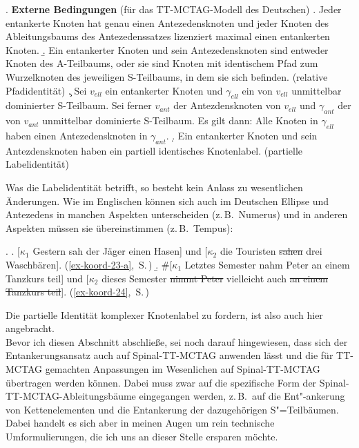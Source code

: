 \ex. {\bf Externe Bedingungen} (für das TT-MCTAG-Modell des Deutschen)
\a. Jeder entankerte Knoten hat genau einen Antezedensknoten und jeder Knoten des Ableitungsbaums des Antezedenssatzes lizenziert maximal einen entankerten Knoten.
\b. Ein entankerter Knoten und sein Antezedensknoten sind entweder Knoten des A-Teilbaums, oder sie sind Knoten mit identischem Pfad zum Wurzelknoten des jeweiligen S-Teilbaums, in dem sie sich befinden. (relative Pfadidentität) 
\c. Sei $v_{ell}$ ein entankerter Knoten und $\gamma_{ell}$ ein von $v_{ell}$ unmittelbar dominierter S-Teilbaum. Sei ferner $v_{ant}$ der Antezdensknoten von $v_{ell}$ und $\gamma_{ant}$ der von $v_{ant}$ unmittelbar dominierte S-Teilbaum. Es gilt dann: Alle Knoten in $\gamma_{ell}$ haben einen Antezedensknoten in $\gamma_{ant}$. 
\d. Ein entankerter Knoten und sein Antezdensknoten haben ein partiell identisches Knotenlabel. (partielle Labelidentität)   
 
Was die Labelidentität betrifft, so besteht kein Anlass zu wesentlichen Änderungen. Wie im Englischen können sich auch im Deutschen Ellipse und Antezedens in manchen Aspekten unterscheiden (z.\,B.\ Numerus) und in anderen Aspekten müssen sie übereinstimmen (z.\,B.\ Tempus): 

\ex. 
\a. [$\kappa_1$ Gestern sah der Jäger einen Hasen] und [$\kappa_2$ die Touristen \sout{sahen} drei Waschbären]. \hfill (\ref{ex-koord-23-a},~S.\,\pageref{ex-koord-23-a})\label{ex-koord-23-a-wdh}
\b. \#[$\kappa_1$ Letztes Semester nahm Peter an einem Tanzkurs teil] und [$\kappa_2$ dieses Semester \sout{nimmt Peter} vielleicht auch \sout{an einem Tanzkurs teil}].\label{ex-koord-24-wdh} \hfill (\ref{ex-koord-24},~S.\,\pageref{ex-koord-24})

Die partielle Identität komplexer Knotenlabel zu fordern, ist also auch hier angebracht.  \\

Bevor ich diesen Abschnitt abschlie\ss e, sei noch darauf hingewiesen, dass sich der Entankerungsansatz auch auf Spinal-TT-MCTAG anwenden lässt und die für TT-MCTAG gemachten Anpassungen im Wesenlichen auf Spinal-TT-MCTAG übertragen werden können. Dabei muss zwar auf die spezifische Form der Spinal-TT-MCTAG-Ableitungsbäume eingegangen werden, z.\,B.\ auf die Ent"-ankerung von Kettenelementen und die Entankerung der dazugehörigen S"=Teilbäumen. Dabei handelt es sich aber in meinen Augen um rein technische Umformulierungen, die ich uns an dieser Stelle ersparen möchte. \\

